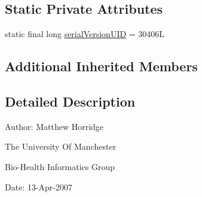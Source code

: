 \subsection*{Static Private Attributes}
\begin{DoxyCompactItemize}
\item 
static final long \hyperlink{classorg_1_1coode_1_1owlapi_1_1owlxml_1_1renderer_1_1_o_w_l_x_m_l_ontology_storage_exception_a6401bc91e12eced79e5c9ad1bc1e720b}{serial\-Version\-U\-I\-D} = 30406\-L
\end{DoxyCompactItemize}
\subsection*{Additional Inherited Members}


\subsection{Detailed Description}
Author\-: Matthew Horridge\par
 The University Of Manchester\par
 Bio-\/\-Health Informatics Group\par
 Date\-: 13-\/\-Apr-\/2007\par
\par
 

